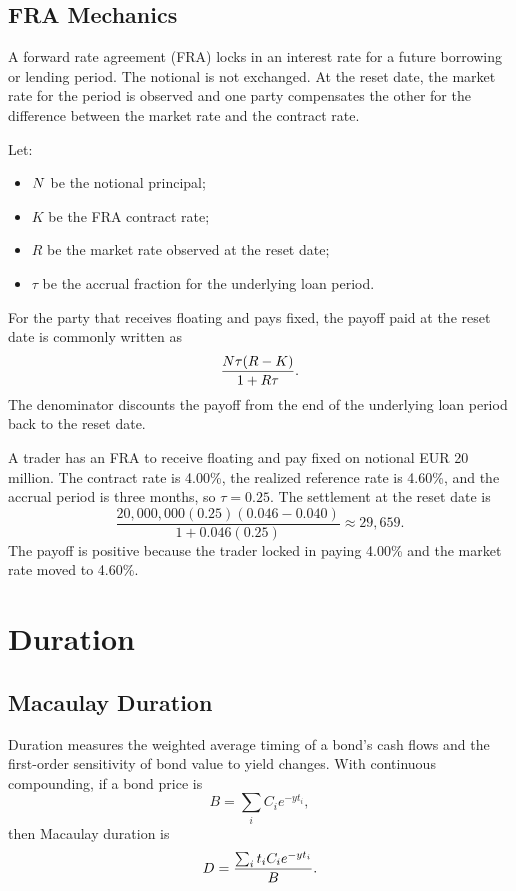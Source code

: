 \subsection{FRA Mechanics}

A forward rate agreement (FRA) locks in an interest rate for a future borrowing
or lending period. The notional is not exchanged. At the reset date, the market
rate for the period is observed and one party compensates the other for the
difference between the market rate and the contract rate.

Let:
\begin{itemize}
    \item $N$ be the notional principal;
    \item $K$ be the FRA contract rate;
    \item $R$ be the market rate observed at the reset date;
    \item $\tau$ be the accrual fraction for the underlying loan period.
\end{itemize}

For the party that receives floating and pays fixed, the payoff paid at the
reset date is commonly written as
\[
    \frac{N \tau (R-K)}{1+R\tau}.
\]
The denominator discounts the payoff from the end of the underlying loan period
back to the reset date.

\begin{exmp}
A trader has an FRA to receive floating and pay fixed on notional EUR 20
million. The contract rate is 4.00\%, the realized reference rate is 4.60\%,
and the accrual period is three months, so $\tau=0.25$. The settlement at the
reset date is
\[
    \frac{20{,}000{,}000(0.25)(0.046-0.040)}
    {1+0.046(0.25)}
    \approx 29{,}659.
\]
The payoff is positive because the trader locked in paying 4.00\% and the
market rate moved to 4.60\%.
\end{exmp}

\section{Duration}

\subsection{Macaulay Duration}

Duration measures the weighted average timing of a bond's cash flows and the
first-order sensitivity of bond value to yield changes. With continuous
compounding, if a bond price is
\[
    B=\sum_i C_i e^{-y t_i},
\]
then Macaulay duration is
\[
    D=\frac{\sum_i t_i C_i e^{-y t_i}}{B}.
\]

